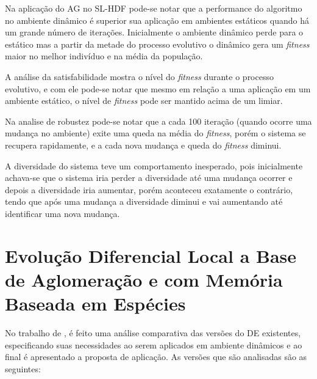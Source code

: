 Na aplicação do AG no SL-HDF pode-se notar que a performance do algoritmo no ambiente dinâmico é superior sua aplicação em ambientes estáticos quando há um grande número de iterações. Inicialmente o ambiente dinâmico perde para o estático mas a partir da metade do processo evolutivo o dinâmico gera um \textit{fitness} maior no melhor indivíduo e na média da população.

A análise da satisfabilidade mostra o nível do \textit{fitness} durante o processo evolutivo, e com ele pode-se notar que mesmo em relação a uma aplicação em um ambiente estático, o nível de \textit{fitness} pode ser mantido acima de um limiar.

Na analise de robustez pode-se notar que a cada 100 iteração (quando ocorre uma mudança no ambiente) exite uma queda na média do \textit{fitness}, porém o sistema se recupera rapidamente, e a cada nova mudança e queda do \textit{fitness} diminui.

A diversidade do sistema teve um comportamento inesperado, pois inicialmente achava-se que o sistema iria perder a diversidade até uma mudança ocorrer e depois a diversidade iria aumentar, porém aconteceu exatamente o contrário, tendo que após uma mudança a diversidade diminui e vai aumentando até identificar uma nova mudança.

\section{Evolução Diferencial Local a Base de Aglomeração e com Memória Baseada em Espécies}
\label{sec:crowding_base_de}

No trabalho de \cite{kundu2013crowding}, é feito uma análise comparativa das versões do DE existentes, especificando suas necessidades ao serem aplicados em ambiente dinâmicos e ao final é apresentado a proposta de aplicação. As versões que são analisadas são as seguintes:

